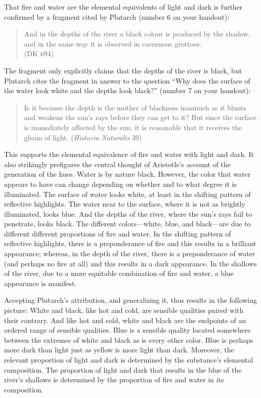 That fire and water are the elemental equivalents of light and dark is further confirmed by a fragment cited by Plutarch (number 6 on your handout):
\begin{verse}
    And in the depths of the river a black colour is produced by the shadow,\\
    and in the same way it is observed in cavernous grottoes.\\
    (DK \textsc{b}94)
\end{verse}
The fragment only explicitly claims that the depths of the river is black, but Plutarch cites the fragment in answer to the question ``Why does the surface of the water look white and the depths look black?'' (number 7 on your handout):
\begin{quote}
    Is it because the depth is the mother of blackness inasmuch as it blunts and weakens the sun's rays before they can get to it? But since the surface is immediately affected by the sun, it is reasonable that it receives the gleam of light.  (\emph{Historia Naturalis} 39)
\end{quote}
This supports the elemental equivalence of fire and water with light and dark. It also strikingly prefigures the central thought of Aristotle's account of the generation of the hues. Water is by nature black. However, the color that water appears to have can change depending on whether and to what degree it is illuminated. The surface of water looks white, at least in the shifting pattern of reflective highlights. The water near to the surface, where it is not as brightly illuminated, looks blue. And the depths of the river, where the sun's rays fail to penetrate, looks black. The different colors---white, blue, and black---are due to different different proportions of fire and water. In the shifting pattern of reflective highlights, there is a preponderance of fire and this results in a brilliant appearance; whereas, in the depth of the river, there is a preponderance of water (and perhaps no fire at all) and this results in a dark appearance. In the shallows of the river, due to a more equitable combination of fire and water, a blue appearance is manifest.

Accepting Plutarch's attribution, and generalizing it, thus results in the following picture: White and black, like hot and cold, are sensible qualities paired with their contrary. And like hot and cold, white and black are the endpoints of an ordered range of sensible qualities. Blue is a sensible quality located somewhere between the extremes of white and black as is every other color. Blue is perhaps more dark than light just as yellow is more light than dark. Moreover, the relevant proportion of light and dark is determined by the substance's elemental composition. The proportion of light and dark that results in the blue of the river's shallows is determined by the proportion of fire and water in its composition.

